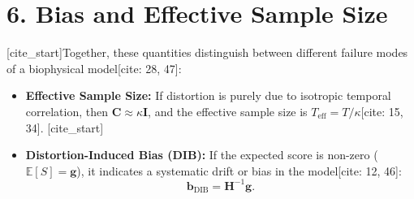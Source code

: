 \documentclass[11pt]{article}
\begin{document}
\section*{6. Bias and Effective Sample Size}
[cite_start]Together, these quantities distinguish between different failure modes of a biophysical model[cite: 28, 47]:
\begin{itemize}
    [cite_start]\item \textbf{Effective Sample Size:} If distortion is purely due to isotropic temporal correlation, then $\mathbf{C} \approx \kappa \mathbf{I}$, and the effective sample size is $T_{\mathrm{eff}} = T/\kappa$[cite: 15, 34].
    [cite_start]\item \textbf{Distortion-Induced Bias (DIB):} If the expected score is non-zero ($\mathbb{E}[S] = \mathbf{g}$), it indicates a systematic drift or bias in the model[cite: 12, 46]:
    \begin{equation}
    \mathbf{b}_{\mathrm{DIB}} = \mathbf{H}^{-1} \mathbf{g}.
    \end{equation}
\end{itemize}
\end{document}
